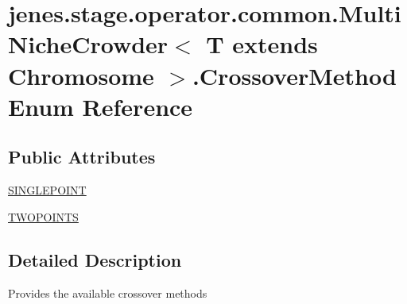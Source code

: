 \hypertarget{enumjenes_1_1stage_1_1operator_1_1common_1_1_multi_niche_crowder_3_01_t_01extends_01_chromosome_01_4_1_1_crossover_method}{\section{jenes.\-stage.\-operator.\-common.\-Multi\-Niche\-Crowder$<$ T extends Chromosome $>$.Crossover\-Method Enum Reference}
\label{enumjenes_1_1stage_1_1operator_1_1common_1_1_multi_niche_crowder_3_01_t_01extends_01_chromosome_01_4_1_1_crossover_method}
}
\subsection*{Public Attributes}
\begin{DoxyCompactItemize}
\item 
\hyperlink{enumjenes_1_1stage_1_1operator_1_1common_1_1_multi_niche_crowder_3_01_t_01extends_01_chromosome_01_4_1_1_crossover_method_a49f5eb549967ad480c1071715dc9eaca}{S\-I\-N\-G\-L\-E\-P\-O\-I\-N\-T}
\item 
\hyperlink{enumjenes_1_1stage_1_1operator_1_1common_1_1_multi_niche_crowder_3_01_t_01extends_01_chromosome_01_4_1_1_crossover_method_a3a9f9178e66dbdd8876205ced92a6959}{T\-W\-O\-P\-O\-I\-N\-T\-S}
\end{DoxyCompactItemize}


\subsection{Detailed Description}
Provides the available crossover methods 

